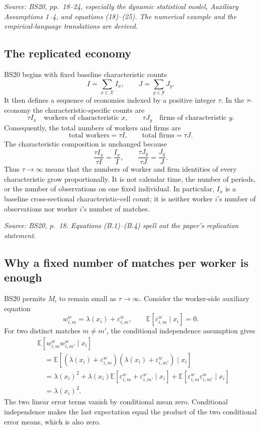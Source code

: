 \documentclass[11pt]{article}
\begin{document}
\textit{Source: BS20, pp.\ 18--24, especially the dynamic statistical model,
Auxiliary Assumptions 1--4, and equations (18)--(25).  The numerical example
and the empirical-language translations are derived.}

\subsection{The replicated economy}

BS20 begins with fixed baseline characteristic counts
\[
I=\sum_{x\in\mathcal X}I_x,
\qquad
J=\sum_{y\in\mathcal Y}J_y.
\tag{B.1}
\]
It then defines a sequence of economies indexed by a positive integer
\(\tau\).  In the \(\tau\)-economy the characteristic-specific counts are
\[
\tau I_x\quad\text{workers of characteristic }x,
\qquad
\tau J_y\quad\text{firms of characteristic }y.
\tag{B.2}
\]
Consequently, the total numbers of workers and firms are
\[
\text{total workers}=\tau I,
\qquad
\text{total firms}=\tau J.
\tag{B.3}
\]
The characteristic composition is unchanged because
\[
\frac{\tau I_x}{\tau I}
=
\frac{I_x}{I},
\qquad
\frac{\tau J_y}{\tau J}
=
\frac{J_y}{J}.
\tag{B.4}
\]
Thus \(\tau\to\infty\) means that the numbers of worker and firm identities
of every characteristic grow proportionally.  It is not calendar time, the
number of periods, or the number of observations on one fixed individual.
In particular, \(I_x\) is a baseline cross-sectional characteristic-cell
count; it is neither worker \(i\)'s number of observations nor worker
\(i\)'s number of matches.

\textit{Source: BS20, p.\ 18.  Equations (B.1)--(B.4) spell out the
paper's replication statement.}

\subsection{Why a fixed number of matches per worker is enough}

BS20 permits \(M_i\) to remain small as \(\tau\to\infty\).  Consider the
worker-side auxiliary equation
\[
w^w_{i,m}
=
\lambda(x_i)+\varepsilon^w_{i,m},
\qquad
\mathbb E[\varepsilon^w_{i,m}\mid x_i]=0.
\tag{B.5}
\]
For two distinct matches \(m\neq m'\), the conditional independence
assumption gives
\[
\begin{aligned}
&\mathbb E[
w^w_{i,m}w^w_{i,m'}\mid x_i]\\
&\quad=
\mathbb E[
(\lambda(x_i)+\varepsilon^w_{i,m})
(\lambda(x_i)+\varepsilon^w_{i,m'})
\mid x_i]\\
&\quad=
\lambda(x_i)^2
+\lambda(x_i)
\mathbb E[
\varepsilon^w_{i,m}+\varepsilon^w_{i,m'}\mid x_i]
+\mathbb E[
\varepsilon^w_{i,m}\varepsilon^w_{i,m'}\mid x_i]\\
&\quad=
\lambda(x_i)^2.
\end{aligned}
\tag{B.6}
\]
The two linear error terms vanish by conditional mean zero.  Conditional
independence makes the last expectation equal the product of the two
conditional error means, which is also zero.
\end{document}
